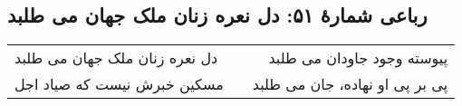 \begin{center}
\section*{رباعی شمارهٔ ۵۱: دل نعره زنان ملک جهان می طلبد}
\label{sec:051}
\begin{longtable}{l p{0.5cm} r}
دل نعره زنان ملک جهان می طلبد
&&
پیوسته وجود جاودان می طلبد
\\
مسکین خبرش نیست که صیاد اجل
&&
پی بر پی او نهاده، جان می طلبد
\\
\end{longtable}
\end{center}
